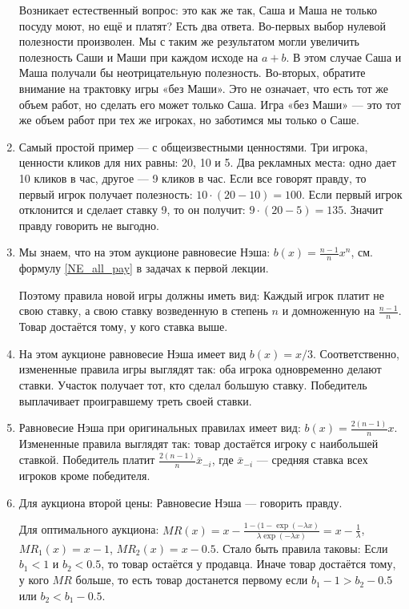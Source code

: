 \begin{enumerate}
Возникает естественный вопрос: это как же так, Саша и Маша не только посуду моют, но ещё и платят? Есть два ответа. Во-первых выбор нулевой полезности произволен. Мы с таким же результатом могли увеличить полезность Саши и Маши при каждом исходе на $ a+b $. В этом случае Саша и Маша получали бы неотрицательную полезность. Во-вторых, обратите внимание на трактовку игры «без Маши». Это не означает, что есть тот же объем работ, но сделать его может только Саша. Игра «без Маши» — это тот же объем работ при тех же игроках, но заботимся мы только о Саше.

\item Самый простой пример — с общеизвестными ценностями. Три игрока, ценности кликов для них равны: 20, 10 и 5. Два рекламных места: одно дает 10 кликов в час, другое — 9 кликов в час. Если все говорят правду, то первый игрок получает полезность: $ 10\cdot (20-10)=100 $. Если первый игрок отклонится и сделает ставку 9, то он получит: $ 9\cdot (20-5)=135 $. Значит правду говорить не выгодно.

\item Мы знаем, что на этом аукционе равновесие Нэша: $ b(x)=\frac{n-1}{n}x^{n} $, см. формулу \ref{NE_all_pay} в задачах к первой лекции.

Поэтому правила новой игры должны иметь вид: Каждый игрок платит не свою ставку, а свою ставку возведенную в степень $ n $ и домноженную на $ \frac{n-1}{n} $. Товар достаётся тому, у кого ставка выше.


\item На этом аукционе равновесие Нэша имеет вид $ b(x)=x/3 $. Соответственно, измененные правила игры выглядят так: оба игрока одновременно делают ставки. Участок получает тот, кто сделал большую ставку. Победитель выплачивает проигравшему треть своей ставки.

\item Равновесие Нэша при оригинальных правилах имеет вид: $ b(x)=\frac{2(n-1)}{n}x $. Измененные правила выглядят так: товар достаётся игроку с наибольшей ставкой. Победитель платит $ \frac{2(n-1)}{n}\bar{x}_{-i} $, где $ \bar{x}_{-i} $ — средняя ставка всех игроков кроме победителя.

\item Для аукциона второй цены: Равновесие Нэша — говорить правду.

Для оптимального аукциона: $ MR(x)=x-\frac{1-(1-\exp(-\lambda x)}{\lambda \exp(-\lambda x)}=x-\frac{1}{\lambda} $, $ MR_{1}(x)=x-1 $, $ MR_{2}(x)=x-0.5 $.  Стало быть правила таковы: Если $ b_{1}<1 $ и $ b_{2}<0.5 $, то товар остаётся у продавца. Иначе товар достаётся тому, у кого $ MR $ больше, то есть товар достанется первому если $ b_{1}-1>b_{2}-0.5 $ или $ b_{2}<b_{1}-0.5 $.


\end{enumerate}
